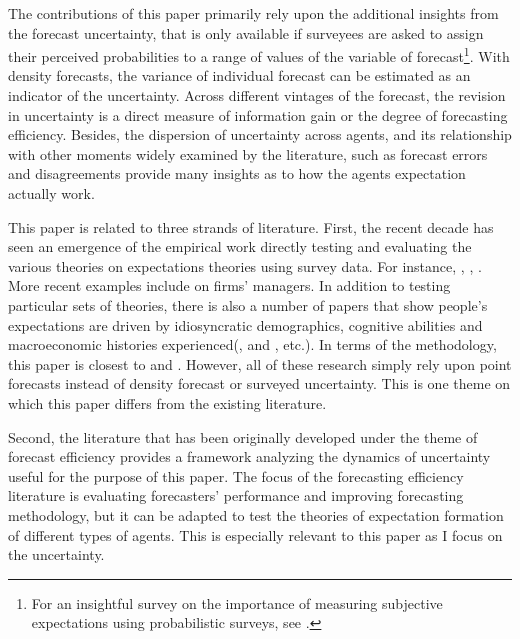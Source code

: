 \documentclass[12pt]{article}
\begin{document}
	The contributions of this paper primarily rely upon the additional insights from the forecast uncertainty, that is only available if surveyees are asked to assign their perceived probabilities to a range of values of the variable of forecast\footnote{For an insightful survey on the importance of measuring subjective expectations using probabilistic surveys, see \citet{manski2004measuring}.}. With density forecasts,  the variance of individual forecast can be estimated as an indicator of the uncertainty. Across different vintages of the forecast, the revision in uncertainty is a direct measure of  information gain or the degree of forecasting efficiency. Besides, the dispersion of uncertainty across agents, and its relationship with other moments widely examined by the literature, such as forecast errors and disagreements provide many insights as to how the agents expectation actually work.  
	
	This paper is related to three strands of literature. First, the recent decade has seen an emergence of the empirical work directly testing and evaluating the various theories on expectations theories using survey data. For instance, \citet{mankiw2003disagreement}, \citet{carroll2003macroeconomic}, \citet{branch2004theory}. More recent examples include \citet{coibion2018firms} on firms' managers. In addition to testing particular sets of theories, there is also a number of papers that show people's expectations are driven by idiosyncratic demographics, cognitive abilities and macroeconomic histories experienced(\citet{malmendier2015learning}, \citet{das2017socioeconomic} and \citet{d2019iq}, etc.). In terms of the methodology, this paper is closest to \citet{coibion2012can} and \citet{fuhrer2018intrinsic}.  However, all of these research simply rely upon point forecasts instead of density forecast or surveyed uncertainty. This is one theme on which this paper differs from the existing literature.   
	
	Second, the literature that has been originally developed under the theme of forecast efficiency provides a framework analyzing the dynamics of uncertainty useful for the purpose of this paper. The focus of the forecasting efficiency literature is evaluating forecasters' performance and improving forecasting methodology, but it can be adapted to test the theories of expectation formation of different types of agents. This is especially relevant to this paper as I focus on the uncertainty. 
	
\end{document}

